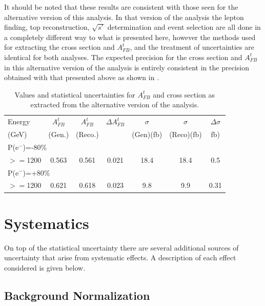It should be noted that these results are consistent with those seen for the alternative version of this analysis\cite{TopPaperDraft}. In that version of the analysis the lepton finding, top reconstruction, $\sqrt{s'}$ determination and event selection are all done in a completely different way to what is presented here, however the methods used for extracting the cross section and $A_{FB}^t$, and the treatment of uncertainties are identical for both analyses. The expected precision for the cross section and $A_{FB}^t$ in this alternative version of the analysis is entirely consistent in the precision obtained with that presented above as shown in . 

\begin{table}
  \centering
  \begin{tabular}{l|c|c|c|c|c|c}
    \toprule
    Energy & $A_{FB}^t$ & $A_{FB}^t$  & $\Delta A^t_{FB}$ &  $\sigma$  &  $\sigma$  &  $\Delta\sigma$ \\
    (GeV) & (Gen.) & (Reco.) &  &  (Gen)(fb) &  (Reco)(fb) &  fb)\\
    \midrule
    \midrule
    \multicolumn{7}{l}{P(e$^-$)=-80\%} \\
    \midrule
    \midrule
    $>=$1200  & 0.563 & 0.561 & 0.021 & 18.4 & 18.4 & 0.5 \\
    \midrule
    \midrule
    \multicolumn{7}{l}{ P(e$^-$)=+80\%}\\
    \midrule
    \midrule
    $>=$1200  & 0.621 & 0.618 & 0.023 & 9.8 & 9.9 & 0.31 \\
    \bottomrule
  \end{tabular}
  \caption{Values and statistical uncertainties for $A_{FB}^t$ and cross section as extracted from the alternative version of the analysis\cite{TopPaperDraft}.}
  \label{tab:RickardResults}
\end{table}

\section{Systematics}
\label{sec:topsystematics}

On top of the statistical uncertainty there are several additional sources of uncertainty that arise from systematic effects. A description of each effect considered is given below. 

\subsection{Background Normalization}

